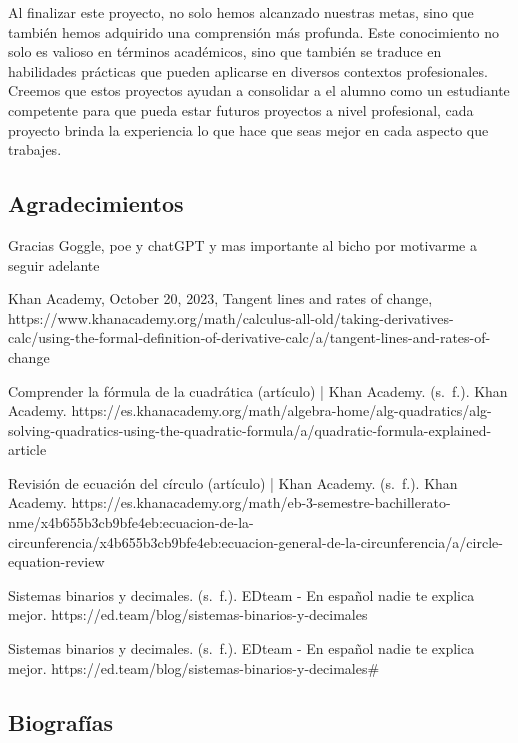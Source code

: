 \documentclass[conference]{IEEEtran}
\begin{document}
Al finalizar este proyecto, no solo hemos alcanzado nuestras metas, sino que también hemos adquirido una comprensión más profunda. Este conocimiento no solo es valioso en términos académicos, sino que también se traduce en habilidades prácticas que pueden aplicarse en diversos contextos profesionales.
Creemos que estos proyectos ayudan a consolidar a el alumno como un estudiante competente para que pueda estar futuros proyectos a nivel profesional, cada proyecto brinda la experiencia lo que hace que seas mejor en cada aspecto que trabajes.

\subsection{Agradecimientos}
Gracias  Goggle, poe y chatGPT y mas importante al bicho por motivarme  a seguir adelante

\begin{thebibliography}{00}
  Khan Academy, October 20, 2023, Tangent lines and rates of change,
  https://www.khanacademy.org/math/calculus-all-old/taking-derivatives-calc/using-the-formal-definition-of-derivative-calc/a/tangent-lines-and-rates-of-change


    Comprender la fórmula de la cuadrática (artículo) | Khan Academy. (s. f.). Khan Academy. https://es.khanacademy.org/math/algebra-home/alg-quadratics/alg-solving-quadratics-using-the-quadratic-formula/a/quadratic-formula-explained-article


    Revisión de ecuación del círculo (artículo) | Khan Academy. (s. f.). Khan Academy. https://es.khanacademy.org/math/eb-3-semestre-bachillerato-nme/x4b655b3cb9bfe4eb:ecuacion-de-la-circunferencia/x4b655b3cb9bfe4eb:ecuacion-general-de-la-circunferencia/a/circle-equation-review

    Sistemas binarios y decimales. (s. f.). EDteam - En español nadie te explica mejor. https://ed.team/blog/sistemas-binarios-y-decimales

    Sistemas binarios y decimales. (s. f.). EDteam - En español nadie te explica mejor. https://ed.team/blog/sistemas-binarios-y-decimales#
    
\end{thebibliography}

\subsection{Biografías}
\end{document}
